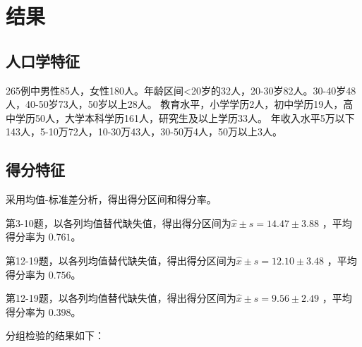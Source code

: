 \documentclass{article}
\begin{document}
\section{结果}

\subsection{人口学特征}
265例中男性85人，女性180人。年龄区间<20岁的32人，20-30岁82人。30-40岁48人，40-50岁73人，50岁以上28人。
教育水平，小学学历2人，初中学历19人，高中学历50人，大学本科学历161人，研究生及以上学历33人。
年收入水平5万以下143人，5-10万72人，10-30万43人，30-50万4人，50万以上3人。

\subsection{得分特征}
采用均值-标准差分析，得出得分区间和得分率。

第3-10题，以各列均值替代缺失值，得出得分区间为$\hat{x}\pm s = 14.47 \pm 3.88$ ，平均得分率为 $0.761$。

第12-19题，以各列均值替代缺失值，得出得分区间为$\hat{x}\pm s = 12.10 \pm 3.48$ ，平均得分率为 $0.756$。

第12-19题，以各列均值替代缺失值，得出得分区间为$\hat{x}\pm s = 9.56 \pm 2.49$ ，平均得分率为 $0.398$。

分组检验的结果如下：
\end{document}
